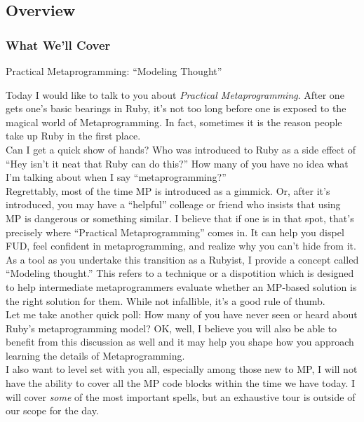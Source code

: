 \documentclass[slidestop,compress,mathserif,notes]{beamer}
\begin{document}
\subsection{Overview}

\begin{frame}
	\frametitle{What We'll Cover}
	\begin{center}
		Practical Metaprogramming:  ``Modeling Thought''
	\end{center}
\end{frame}
\note
{
\tiny
Today I would like to talk to you about \emph{Practical Metaprogramming}.
After one gets one's basic bearings in Ruby, it's not too long before one is
exposed to the magical world of Metaprogramming. In fact, sometimes it is the
reason people take up Ruby in the first place.
\\
Can I get a quick show of hands? Who was introduced to Ruby as a side effect
of ``Hey isn't it neat that Ruby can do this?'' How many of you have no idea
what I'm talking about when I say ``metaprogramming?''
\\
Regrettably, most of the time MP is introduced as a gimmick. Or, after it's
introduced, you may have a ``helpful'' colleage or friend who insists that
using MP is dangerous or something similar. I believe that if one is in that
spot, that's precisely where ``Practical Metaprogramming'' comes in. It can
help you dispel FUD, feel confident in metaprogramming, and realize why you
can't hide from it.
\\
As a tool as you undertake this transition as a Rubyist, I provide a concept
called ``Modeling thought.'' This refers to a technique or a dispotition which
is designed to help intermediate metaprogrammers evaluate whether an MP-based
solution is the right solution for them.  While not infallible, it's a good
rule of thumb.
\\
Let me take another quick poll: How many of you have never seen or heard about
Ruby's metaprogramming model? OK, well, I believe you will also be able to
benefit from this discussion as well and it may help you shape how you
approach learning the details of Metaprogramming.
\\
I also want to level set with you all, especially among those new to MP, I
will not have the ability to cover all the MP code blocks within the time we
have today. I will cover \emph{some} of the most important spells, but an
exhaustive tour is outside of our scope for the day.
\normalsize
}
\end{document}

